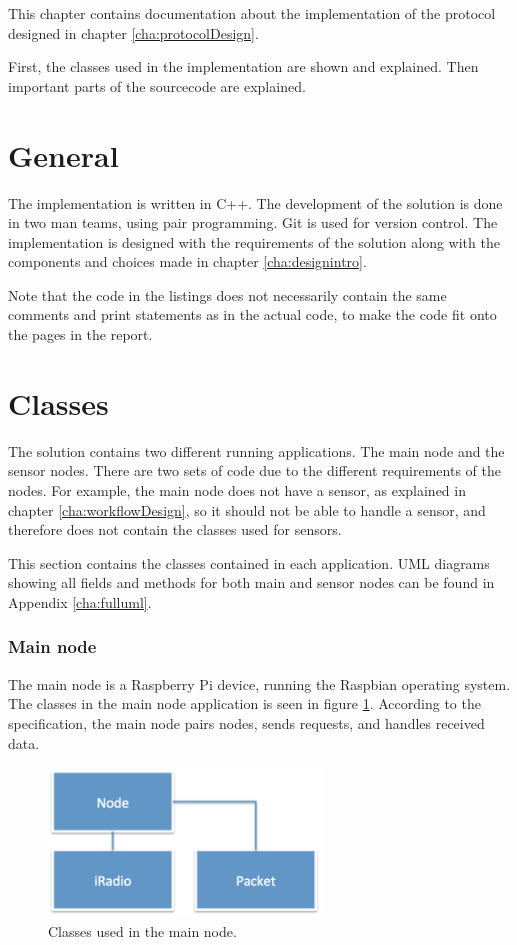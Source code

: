 This chapter contains documentation about the implementation of the protocol designed in chapter \ref{cha:protocolDesign}. 

First, the classes used in the implementation are shown and explained. Then important parts of the sourcecode are explained.
 

\section{General}
The implementation is written in C++. The development of the solution is done in two man teams, using pair programming. Git is used for version control. The implementation is designed with the requirements of the solution along with the components and choices made in chapter \ref{cha:designintro}. 

Note that the code in the listings does not necessarily contain the same comments and print statements as in the actual code, to make the code fit onto the pages in the report.

\section{Classes}
The solution contains two different running applications. The main node and the sensor nodes. There are two sets of code due to the different requirements of the nodes. For example, the main node does not have a sensor, as explained in chapter \ref{cha:workflowDesign}, so it should not be able to handle a sensor, and therefore does not contain the classes used for sensors.

This section contains the classes contained in each application. UML diagrams showing all fields and methods for both main and sensor nodes can be found in Appendix \ref{cha:fulluml}.

\subsubsection*{Main node}
The main node is a Raspberry Pi device, running the Raspbian operating system. The classes in the main node application is seen in figure \ref{fig:mainnodeClass}. 
According to the specification, the main node pairs nodes, sends requests, and handles received data.

\begin{figure}[h!]
\centering
\includegraphics[width=0.65\textwidth]{chapters/implementation/figures/mainnodeClass.png}
\caption{Classes used in the main node.}
\label{fig:mainnodeClass}
\end{figure}



